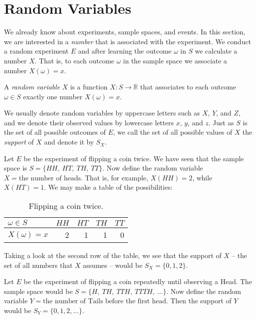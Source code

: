 \section{Random Variables}
\label{sec-4-9}

We already know about experiments, sample spaces, and events. In this
section, we are interested in a \emph{number} that is associated with the
experiment. We conduct a random experiment \(E\) and after learning
the outcome \(\omega\) in \(S\) we calculate a number \(X\). That is,
to each outcome \(\omega\) in the sample space we associate a number
\(X(\omega)=x\).

\begin{defn}
A \emph{random variable} \(X\) is a function \(X:S\to\mathbb{R}\) that
associates to each outcome \(\omega\in S\) exactly one number
\(X(\omega)=x\).
\end{defn}

We usually denote random variables by uppercase letters such as \(X\),
\(Y\), and \(Z\), and we denote their observed values by lowercase
letters \(x\), \(y\), and \(z\). Just as \(S\) is the set of all
possible outcomes of \(E\), we call the set of all possible values of
\(X\) the \emph{support} of \(X\) and denote it by \(S_{X}\).


Let \(E\) be the experiment of flipping a coin twice. We have seen
that the sample space is \( S = \{ HH,\ HT,\ TH,\ TT \} \). Now define
the random variable \(X = \mbox{the number of heads}\). That is, for
example, \(X(HH)=2\), while \(X(HT)=1\). We may make a table of the
possibilities:

\begin{table}[htb]
\caption[Flipping a coin twice]{\label{tab-flip-coin-twice}Flipping a coin twice.}
\centering
\begin{tabular}{lrrrr}
\(\omega\in S\) & \(HH\) & \(HT\) & \(TH\) & \(TT\)\\
\hline
\(X(\omega)=x\) & 2 & 1 & 1 & 0\\
\end{tabular}
\end{table}

Taking a look at the second row of the table, we see that the support
of \(X\) -- the set of all numbers that \(X\) assumes -- would be \(
S_{X}= \{ 0,1,2 \} \).



Let \(E\) be the experiment of flipping a coin repeatedly until
observing a Head. The sample space would be \(S= \{ H,\ TH,\ TTH,\
TTTH,\ \ldots \} \). Now define the random variable \(Y=\mbox{the
number of Tails before the first head}\). Then the support of \(Y\)
would be \( S_{Y}= \{ 0,1,2,\ldots \} \).




